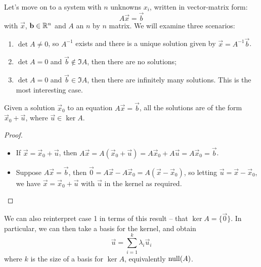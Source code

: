 \documentclass{../template/note}
\begin{document}
    Let's move on to a system with \(n\) unknowns \(x_i\), written in vector-matrix form:
    \[
        A\vec x = \vec b
    \]
    with \(\vec x\), \(\vec b \in \RR^n\) and \(A\) an \(n\) by \(n\) matrix. We will examine three scenarios:
    \begin{enumerate}[label=\protect\circled{\arabic*}]
        \item \(\det A \neq 0\), so \(A^{-1}\) exists and there is a unique solution given by \(\vec x = A^{-1} \vec b\).
        \item \(\det A = 0\) and \(\vec b \notin \Im A\), then there are no solutions;
        \item \(\det A = 0\) and \(\vec b \in \Im A\), then there are infinitely many solutions. This is the most interesting case.
    \end{enumerate}
    
    \begin{proposition}
        Given a solution \(\vec x_0\) to an equation \(A \vec x = \vec b\), all the solutions are of the form \(\vec x_0 + \vec u\), where \(\vec u \in \ker A\).
    \end{proposition}
    
    \begin{proof}
        \begin{itemize}
            \item[\(\impliedby\)] If \(\vec x = \vec x_0 + \vec u\), then \(A \vec x = A (\vec x_0 + \vec u) = A \vec x_0 + A \vec u = A \vec x_0 = \vec b\).
            \item[\(\implies\)] Suppose \(A \vec x = \vec b\), then \(\vec 0 = A \vec x - A \vec x_0 = A(\vec x - \vec x_0)\), so letting \(\vec u = \vec x - \vec x_0\), we have \(\vec x = \vec x_0 + \vec u\) with \(\vec u\) in the kernel as required.
        \end{itemize}
    \end{proof}
    
    We can also reinterpret case 1 in terms of this result -- that \(\ker A = \{\vec 0\}\). In particular, we can then take a basis for the kernel, and obtain
    \[
        \vec u = \sum_{i=1}^k \lambda_i \vec u_i
    \]
    where \(k\) is the size of a basis for \(\ker A\), equivalently \(\operatorname{null}(A)\).
\end{document}
